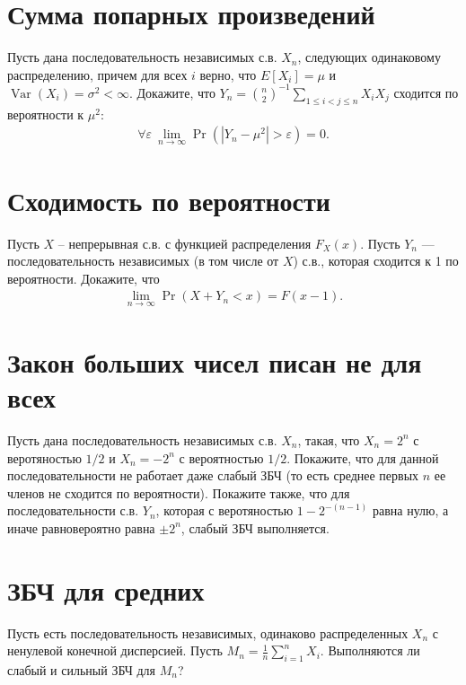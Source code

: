 \documentclass[12pt]{article}
\newcommand\eps{\varepsilon}
\DeclareMathOperator{\Var}{Var}
\begin{document}
\section{Сумма попарных произведений}
Пусть дана последовательность независимых с.в. $X_n$, следующих одинаковому распределению, причем для всех $i$ верно, что $E[X_i] = \mu$ и $\Var(X_i) = \sigma^2 < \infty$.
Докажите, что $Y_n = \binom{n}{2}^{-1} \sum_{1 \le i < j \le n} X_i X_j$ сходится по вероятности к $\mu^2$:
\begin{align*}
    \forall \eps \ \lim_{n \to \infty} \Pr(|Y_n - \mu^2| > \eps) = 0.
\end{align*}

\section{Сходимость по вероятности}

Пусть $X$ -- непрерывная с.в. с функцией распределения $F_X(x)$. Пусть $Y_n$ --- последовательность независимых (в том числе от $X$) с.в., которая сходится к 1 по вероятности. Докажите, что
\begin{align*}
    \lim_{n \to \infty}\Pr(X + Y_n < x) = F(x - 1).
\end{align*}

\section{Закон больших чисел писан не для всех}

Пусть дана последовательность независимых с.в. $X_n$, такая, что $X_n = 2^n$ с веротяностью $1/2$ и $X_n = - 2^n$ с вероятностью $1/2$. Покажите, что для данной последовательности не работает даже слабый ЗБЧ (то есть среднее первых $n$ ее членов не сходится по вероятности). Покажите также, что для последовательности с.в. $Y_n$, которая с веротяностью $1 - 2^{-(n - 1)}$ равна нулю, а иначе равновероятно равна $\pm 2^n$, слабый ЗБЧ выполняется.

\section{ЗБЧ для средних}

Пусть есть последовательность независимых, одинаково распределенных $X_n$ с ненулевой конечной дисперсией. Пусть $M_n = \frac{1}{n}\sum_{i = 1}^n X_i$. Выполняются ли слабый и сильный ЗБЧ для $M_n$? 
\end{document}
